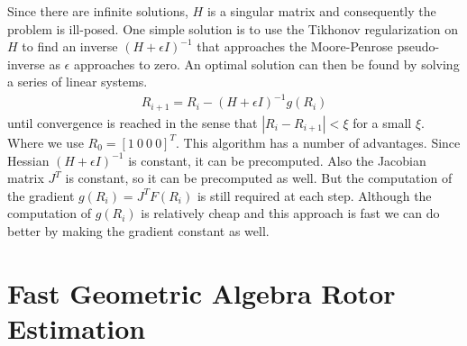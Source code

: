 \documentclass{birkjour}
\numberwithin{equation}{section}
\begin{document}
Since there are infinite solutions, $H$ is a singular matrix and consequently the problem is ill-posed. One simple solution is to use the Tikhonov regularization on $H$ to find an inverse $(H + \epsilon I)^{-1}$ that approaches the Moore-Penrose pseudo-inverse as $\epsilon$ approaches to zero. An optimal solution can then be found by solving a series of linear systems.
\begin{eqnarray*}
R_{i+1} = R_i - (H + \epsilon I)^{-1} g(R_i)
\end{eqnarray*}
until convergence is reached in the sense that $|R_i - R_{i+1}| < \xi$ for a small $\xi$. Where we use $R_0 = [1 \ 0 \ 0 \ 0]^T$. This algorithm has a number of advantages. Since Hessian $(H + \epsilon I)^{-1}$ is constant, it can be precomputed. Also the Jacobian matrix $J^T$ is constant, so it can be precomputed as well. But the computation of the gradient $g(R_i) = J^T F(R_i)$ is still required at each step. Although the computation of $g(R_i)$ is relatively cheap and this approach is fast we can do better by making the gradient constant as well.

\section{Fast Geometric Algebra Rotor Estimation}
\end{document}
